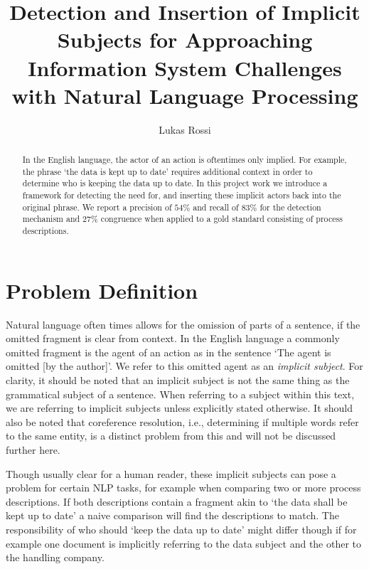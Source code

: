 \documentclass[times, 10pt,twocolumn]{article}
\begin{document}
\title{Detection and Insertion of Implicit Subjects for Approaching Information System Challenges with Natural Language Processing}

\author{Lukas Rossi}

\maketitle
\thispagestyle{empty}

\begin{abstract}
   In the English language, the actor of an action is oftentimes only implied.
   For example, the phrase `the data is kept up to date' requires additional context in order
   to determine who is keeping the data up to date. In this project work we introduce
   a framework for detecting the need for, and inserting these implicit actors back into
   the original phrase. We report a precision of \(54\%\) and recall of \(83\%\) for
   the detection mechanism and \(27\%\) congruence when applied to a gold standard consisting
   of process descriptions.
\end{abstract}



\section{Problem Definition}
Natural language often times allows for the omission of parts of a sentence,
if the omitted fragment is clear from context. In the English language a
commonly omitted fragment is the agent of an action as in the sentence
`The agent is omitted [by the author]'. We refer to this omitted agent as
an \textit{implicit subject}. For clarity, it should be noted that an implicit
subject is not the same thing as the grammatical subject of a sentence. When referring
to a subject within this text, we are referring to implicit subjects unless explicitly
stated otherwise. It should
also be noted that coreference resolution, i.e., determining if multiple words
refer to the same entity, is a distinct problem from this and will not be
discussed further here. 

Though usually clear for a human reader, these implicit subjects can pose a problem
for certain NLP tasks, for example when comparing two or more process descriptions.
If both descriptions contain a fragment akin to `the data shall be kept up to date'
a naive comparison will find the descriptions to match. The responsibility of who
should `keep the data up to date' might differ though if for example one document
is implicitly referring to the data subject and the other to the handling company.
\end{document}
